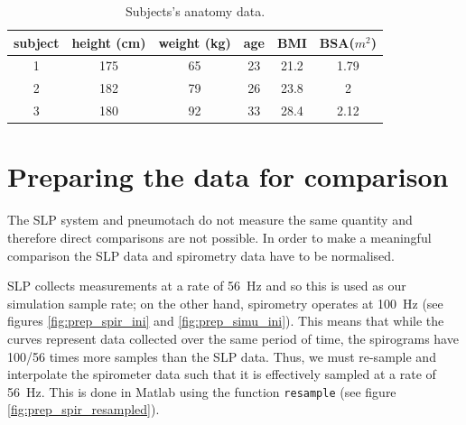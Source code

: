 \begin{table}
\begin{center}
\begin{tabular}{|c|c|c|c|c|c|}
\hline
subject & height (cm) & weight (kg) & age & BMI\footnotemark[1] & BSA\footnotemark[2] ($ m^2 $)\\ 
\hline
\hline
 1 & 175 & 65 & 23 & 21.2 & 1.79\\ 
 2 & 182 & 79 & 26 & 23.8 & 2\\ 
 3 & 180 & 92 & 33 & 28.4 & 2.12\\ 
\hline
\end{tabular}
\end{center}
\caption[Subjects's anatomy data]{\label{tab:patient_car}Subjects's anatomy data.}
\end{table}


\section{\label{sec:prep_data}Preparing the data for comparison}
The SLP system and pneumotach do not measure the same quantity and therefore direct comparisons are not possible. In order to make a meaningful comparison the SLP data and spirometry data have to be normalised.

SLP collects measurements at a rate of 56~Hz and so this is used as our simulation sample rate; on the other hand, spirometry operates at 100~Hz (see figures \ref{fig:prep_spir_ini} and \ref{fig:prep_simu_ini}). This means that while the curves represent data collected over the same period of time, the spirograms have 100/56 times more samples than the SLP data. Thus, we must re-sample and interpolate the spirometer data such that it is effectively sampled at a rate of 56~Hz. This is done in Matlab using the function \texttt{resample} (see figure \ref{fig:prep_spir_resampled}).

